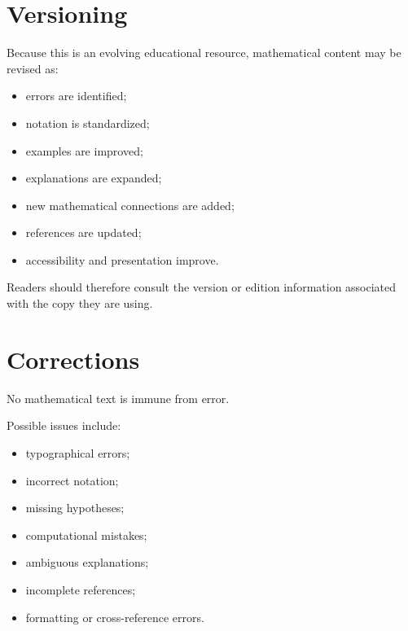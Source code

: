 \section*{Versioning}

Because this is an evolving educational resource, mathematical content may
be revised as:

\begin{itemize}

    \item errors are identified;

    \item notation is standardized;

    \item examples are improved;

    \item explanations are expanded;

    \item new mathematical connections are added;

    \item references are updated;

    \item accessibility and presentation improve.

\end{itemize}

Readers should therefore consult the version or edition information
associated with the copy they are using.

\section*{Corrections}

No mathematical text is immune from error.

Possible issues include:

\begin{itemize}

    \item typographical errors;

    \item incorrect notation;

    \item missing hypotheses;

    \item computational mistakes;

    \item ambiguous explanations;

    \item incomplete references;

    \item formatting or cross-reference errors.

\end{itemize}

